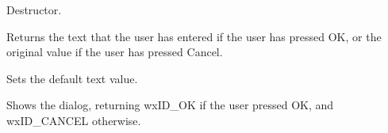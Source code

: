 Destructor.

\label{wxtextentrydialoggetvalue}


Returns the text that the user has entered if the user has pressed OK, or the original value
if the user has pressed Cancel.

\label{wxtextentrydialogsetvalue}


Sets the default text value.

\label{wxtextentrydialogshowmodal}


Shows the dialog, returning wxID\_OK if the user pressed OK, and wxID\_CANCEL
otherwise.


